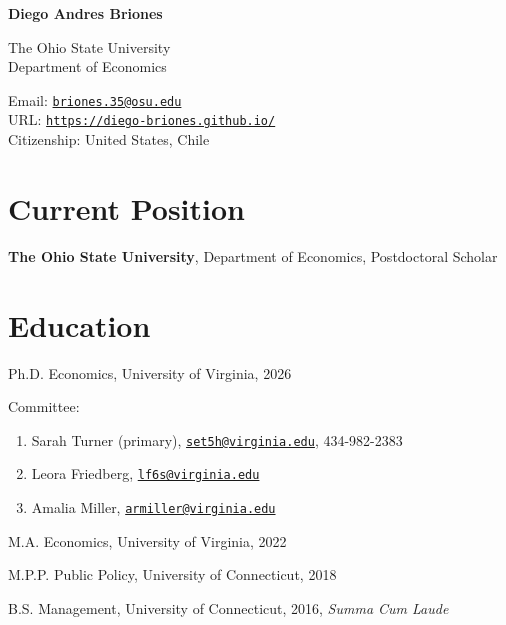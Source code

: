 \documentclass[letterpaper, 11pt]{article}
\renewenvironment{itemize}{
  \begin{list}{}
    { \setlength{\itemsep}{1.2pt} %
      \setlength{\parsep}{0pt}
      \setlength{\topsep}{0pt}
      \setlength{\leftmargin}{0em} } }{
  \end{list}}
\begin{document}
{\huge\bf  Diego Andres Briones}

\begin{minipage}[t]{0.5\textwidth}
    \vspace{0pt}
    The Ohio State University\\
    Department of Economics
\end{minipage}%
\begin{minipage}[t]{0.5\textwidth}
    \vspace{0pt}
    Email: \href{mailto:briones.35@osu.edu}{\tt briones.35@osu.edu} \\
    URL: \href{https://diego-briones.github.io/}{\tt https://diego-briones.github.io/} \\
    Citizenship: United States, Chile
\end{minipage}

\section*{Current Position}
\begin{itemize}
\item \textbf{The Ohio State University}, Department of Economics, Postdoctoral Scholar
\end{itemize}

\section*{Education}
\begin{itemize}
\item Ph.D. Economics, University of Virginia, 2026
\begin{itemize}
    \item [] Committee: 
     \begin{enumerate}
     \item Sarah Turner (primary), \href{mailto:set5h@virginia.edu}{\tt set5h@virginia.edu}, 434-982-2383
     \item Leora Friedberg, \href{mailto:lf6s@virginia.edu}{\tt lf6s@virginia.edu}
     \item Amalia Miller, \href{mailto:armiller@virginia.edu}{\tt armiller@virginia.edu}
 \end{enumerate}
\end{itemize}
\item M.A. Economics, University of Virginia, 2022
\item M.P.P. Public Policy, University of Connecticut, 2018
\item B.S. Management, University of Connecticut, 2016, \textit{Summa Cum Laude}
\end{itemize}
\end{document}
